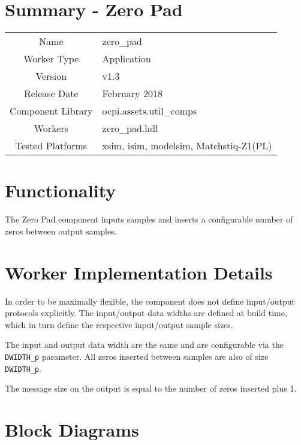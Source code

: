 \documentclass{article}
\author{} %
\date{Version \docVersion} %
\title{\docTitle}
\def\comp{zero\_pad}
\def\Comp{Zero Pad}
\begin{document}
\section*{Summary - \Comp}
\begin{tabular}{|c|M{13.5cm}|}
	\hline
	                  &                        \\
	\hline
	Name              & \comp                  \\
	\hline
	Worker Type       & Application            \\
	\hline
	Version           & v1.3                  \\
	\hline
	Release Date      & February 2018           \\
	\hline
	Component Library & ocpi.assets.util\_comps \\
	\hline
	Workers           & \comp.hdl              \\
	\hline
	Tested Platforms  & xsim, isim, modelsim, Matchstiq-Z1(PL) \\
	\hline
\end{tabular}

\section*{Functionality}
\begin{flushleft}
	The \Comp{} component inputs samples and inserts a configurable number of zeros between output samples.
\end{flushleft}

\section*{Worker Implementation Details}
\begin{flushleft}
	In order to be maximally flexible, the component does not define input/output protocols explicitly. The input/output data widths are defined at build time, which in turn define the respective input/output sample sizes.\medskip
	
	The input and output data width are the same and are configurable via the \verb+DWIDTH_p+ parameter. All zeros inserted between samples are also of size \verb+DWIDTH_p+.\medskip
	
	The message size on the output is equal to the number of zeros inserted plus 1.
\end{flushleft}

\section*{Block Diagrams}
\end{document}
